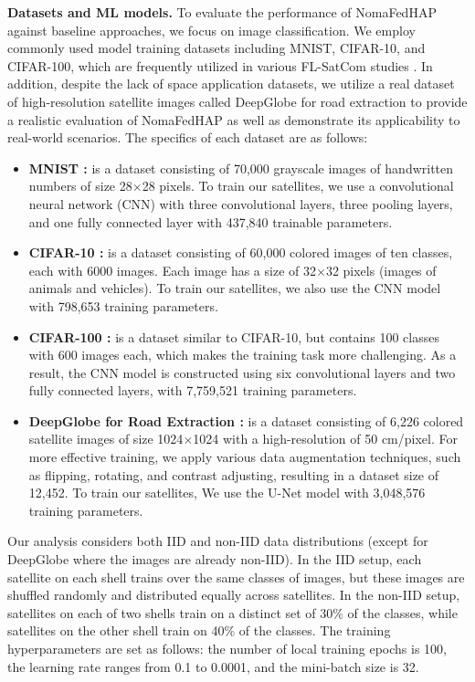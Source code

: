 \documentclass[letter,journal]{IEEEtran}
\begin{document}
\textbf{Datasets and ML models.}  To evaluate the performance of NomaFedHAP against baseline approaches, we focus on image classification. We employ commonly used model training datasets including MNIST, CIFAR-10, and CIFAR-100, which are frequently utilized in various FL-SatCom studies \cite{chen2022satellite,razmi2022scheduling, happaper,mAsyFLEO}. In addition, despite the lack of space application datasets, we utilize a real dataset of high-resolution satellite images called DeepGlobe for road extraction to provide a realistic evaluation of NomaFedHAP as well as demonstrate its applicability to real-world scenarios. %
The specifics of each dataset are as follows:
\begin{itemize}
    \item \textbf{MNIST \cite{deng2012mnist}:} is a dataset consisting of 70,000 grayscale images of handwritten numbers of size 28$\times$28 pixels. To train our satellites, we use a convolutional neural network (CNN) with three convolutional layers, three pooling layers, and one fully connected layer with 437,840 trainable parameters.

    \item \textbf{CIFAR-10 \cite{CIFAR-10}:} is a dataset consisting of 60,000 colored images of ten classes, each with 6000 images. Each image has a size of 32$\times$32 pixels (images of animals and vehicles). To train our satellites, we also use the CNN model with 798,653 training parameters.

    \item \textbf{CIFAR-100 \cite{CIFAR-10}:} is a dataset similar to CIFAR-10, but contains 100 classes with 600 images each, which makes the training task more challenging. As a result, the CNN model is constructed using six convolutional layers and two fully connected layers, with 7,759,521 training parameters.

    \item \textbf{DeepGlobe for Road Extraction \cite{DeepGlobe18}:} is a dataset consisting of 6,226   colored satellite images of size 1024$\times$1024 with a high-resolution of 50 cm/pixel. For more effective training, we apply various data augmentation techniques, such as flipping, rotating, and contrast adjusting, resulting in a dataset size of 12,452. To train our satellites, We use the U-Net model with 3,048,576 training parameters.
\end{itemize}
Our analysis considers both IID and non-IID data distributions (except for DeepGlobe where the images are already non-IID). In the IID setup, each satellite on each shell trains over the same classes of images, but these images are shuffled randomly and distributed equally across satellites. In the non-IID setup, satellites on each of two shells train on a distinct set of 30\% of the classes, while satellites on the other shell train on 40\% of the classes. The training hyperparameters are set as follows: the number of local training epochs is 100, the learning rate ranges from 0.1 to 0.0001, and the mini-batch size is 32.
\end{document}
